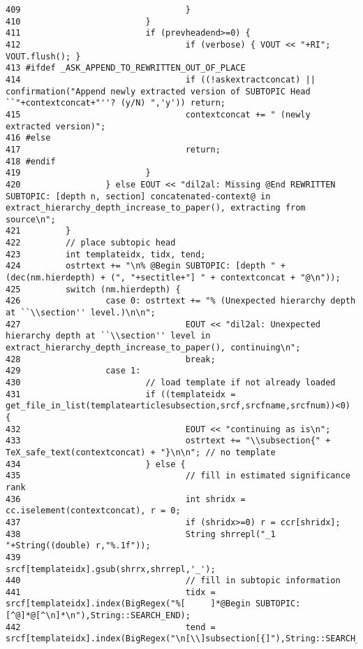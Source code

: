 \begin{verbatim}
409                                 }
410                         }
411                         if (prevheadend>=0) {
412                                 if (verbose) { VOUT << "+RI"; VOUT.flush(); }
413 #ifdef _ASK_APPEND_TO_REWRITTEN_OUT_OF_PLACE
414                                 if ((!askextractconcat) || confirmation("Append newly extracted version of SUBTOPIC Head ``"+contextconcat+"''? (y/N) ",'y')) return;
415                                 contextconcat += " (newly extracted version)";
416 #else
417                                 return;
418 #endif
419                         }
420                 } else EOUT << "dil2al: Missing @End REWRITTEN SUBTOPIC: [depth n, section] concatenated-context@ in extract_hierarchy_depth_increase_to_paper(), extracting from source\n";
421         }
422         // place subtopic head
423         int templateidx, tidx, tend;
424         ostrtext += "\n% @Begin SUBTOPIC: [depth " + (dec(nm.hierdepth) + (", "+sectitle+"] " + contextconcat + "@\n"));
425         switch (nm.hierdepth) {
426                 case 0: ostrtext += "% (Unexpected hierarchy depth at ``\\section'' level.)\n\n";
427                                 EOUT << "dil2al: Unexpected hierarchy depth at ``\\section'' level in extract_hierarchy_depth_increase_to_paper(), continuing\n";
428                                 break;
429                 case 1: 
430                         // load template if not already loaded
431                         if ((templateidx = get_file_in_list(templatearticlesubsection,srcf,srcfname,srcfnum))<0) {
432                                 EOUT << "continuing as is\n";
433                                 ostrtext += "\\subsection{" + TeX_safe_text(contextconcat) + "}\n\n"; // no template
434                         } else {
435                                 // fill in estimated significance rank
436                                 int shridx = cc.iselement(contextconcat), r = 0;
437                                 if (shridx>=0) r = ccr[shridx];
438                                 String shrrepl("_1 "+String((double) r,"%.1f"));
439                                 srcf[templateidx].gsub(shrrx,shrrepl,'_');
440                                 // fill in subtopic information
441                                 tidx = srcf[templateidx].index(BigRegex("%[     ]*@Begin SUBTOPIC:[^@]*@[^\n]*\n"),String::SEARCH_END);
442                                 tend = srcf[templateidx].index(BigRegex("\n[\\]subsection[{]"),String::SEARCH_END,tidx);

\end{verbatim}
